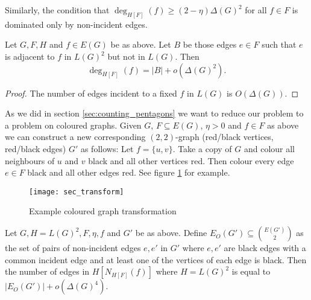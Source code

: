 Similarly, the condition that $\deg_{H[F]}(f) \geq (2-\eta)\Delta(G)^2$ for all
$f\in F$ is dominated only by non-incident edges.
\begin{lemma}
    \label{lemma:sec_degree_non_incident}
    Let $G, F, H$ and $f\in E(G)$ be as above. Let $B$ be those edges $e\in F$
    such that $e$ is adjacent to $f$ in $L(G)^2$ but not in $L(G)$.
    Then
    \[
        \deg_{H[F]}(f) = |B| + o(\Delta(G)^2).
    \]
\end{lemma}
\begin{proof}
    The number of edges incident to a fixed $f$ in $L(G)$ is $O(\Delta(G))$.
\end{proof}

As we did in section \ref{sec:counting_pentagons} we want to reduce our problem to a
problem on coloured graphs.
Given $G$, $F\subseteq E(G)$, $\eta > 0$ and $f \in F$ as above we can construct a
new corresponding $(2,2)$-graph (red/black vertices, red/black edges) $G'$ as follows:
Let $f=\{u, v\}$. Take a copy of $G$ and colour all neighbours of $u$ and $v$ black
and all other vertices red. Then colour every edge $e \in F$ black and all other
edges red. See figure \ref{fig:transform} for example.

\begin{figure}[ht]
    \centering
    \texttt{[image: sec\_transform]}
    \caption{Example coloured graph transformation}
    \label{fig:transform}
\end{figure}

\begin{lemma}
    \label{lemma:sec_black_edge_degree}
    Let $G, H=L(G)^2, F, \eta, f$ and $G'$ be as above.
    Define $E_O(G') \subseteq \binom{E(G')}{2}$ as the set of pairs of non-incident
    edges $e, e'$ in $G'$
    where $e, e'$ are black edges with a common incident edge and
    at least one of the vertices of each edge is black.
    Then the number of edges in $H[N_{H[F]}(f)]$
    where $H=L(G)^2$ is equal to $|E_O(G')| + o(\Delta(G)^4)$.
\end{lemma}

